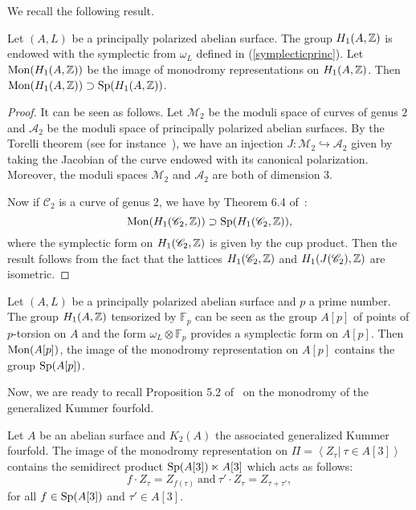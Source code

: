 We recall the following result. 
\begin{prop}
Let $(A,L)$ be a principally polarized abelian surface. The group $H_1(A,\mathbb{Z})$ is endowed with the symplectic from $\omega_L$ defined in (\ref{symplecticprinc}). Let $\operatorname{Mon} (H_1(A,\mathbb{Z}))$ be the image of monodromy representations on $H_1(A,\mathbb{Z})$.
Then $\operatorname{Mon} (H_1(A,\mathbb{Z}))\supset\operatorname{Sp}(H_1(A,\mathbb{Z}))$.
\end{prop}
\begin{proof}
It can be seen as follows.
Let $\mathcal{M}_2$ be the moduli space of curves of genus $2$ and $\mathcal{A}_2$ be the moduli space of principally polarized abelian surfaces.
By the Torelli theorem (see for instance~\cite[Theorem 12.1]{Milne}), we have an injection $J:\mathcal{M}_2\hookrightarrow \mathcal{A}_2$ given by taking the Jacobian of the curve endowed with its canonical polarization. Moreover, the moduli spaces $\mathcal{M}_2$ and $\mathcal{A}_2$ are both of dimension 3. 

Now if $\mathscr{C}_2$ is a curve of genus 2, we have by Theorem 6.4 of~\cite{Farb}: 
$$\operatorname{Mon} (H_1(\mathscr{C}_2,\mathbb{Z}))\supset \operatorname{Sp}(H_1(\mathscr{C}_2,\mathbb{Z})),$$
where the symplectic form on $H_1(\mathscr{C}_2,\mathbb{Z})$ is given by the cup product. 
Then the result follows from the fact that the lattices $H_1(\mathscr{C}_2,\mathbb{Z})$ and $H_1(J(\mathscr{C}_2),\mathbb{Z})$ are isometric.
\end{proof}
\begin{rmk}\label{SPA2}
Let $(A,L)$ be a principally polarized abelian surface and $p$ a prime number. The group $H_1(A,\mathbb{Z})$ tensorized by $\mathbb{F}_p$ can be seen as the group $A[p]$ of points of $p$-torsion on $A$ and the form $\omega_L\otimes\mathbb{F}_p$ provides a symplectic form on $A[p]$. Then $\operatorname{Mon} (A[p])$, the image of the monodromy representation on $A[p]$ contains the group $\operatorname{Sp}(A[p])$. 
\end{rmk}
Now, we are ready to recall Proposition 5.2 of~\cite{Hassett} on the monodromy of the generalized Kummer fourfold.
\begin{prop}\label{Hassettmonodromy}
Let $A$ be an abelian surface and $K_2(A)$ the associated generalized Kummer fourfold. 
The image of the monodromy representation on $\Pi=\left\langle\left. Z_\tau\right|\ \tau\in A[3]\right\rangle$ contains the semidirect product
$\operatorname{Sp}(A[3])\ltimes A[3]$ which acts as follows:
$$f\cdot Z_\tau= Z_{f(\tau)}\ \text{and}\ \tau'\cdot Z_\tau= Z_{\tau+\tau'},$$
for all $f\in \operatorname{Sp}(A[3])$ and $\tau'\in A[3]$.
\end{prop}